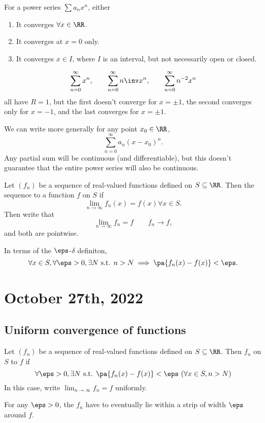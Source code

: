 \documentclass[11pt]{scrartcl}
\numberwithin{equation}{section}
\begin{document}
\begin{corollary}
    For a power series $\sum a_nx^n$, either
    \begin{enumerate}
        \item It converges $\forall x\in\RR$.
        \item It converges at $x=0$ only.
        \item It converges $x\in I$, where $I$ is an interval, but not necessarily open or closed.
    \end{enumerate}
\end{corollary}

\begin{example}
    \[ \sum_{n=0}^{\infty}x^n,\qquad \sum_{n=0}^{\infty}n\inv x^n,\qquad \sum_{n=0}^{\infty}n^{-2} x^n\]
    all have $R=1$, but the first doesn't converge for $x=\pm 1$,
    the second converges only for $x=-1$, and the last converges for 
    $x=\pm 1$.
\end{example}
We can write more generally for any point $x_0\in \RR$,
\[ \sum_{n=0}^{\infty}a_n(x-x_0)^n.\]
Any partial sum will be continuous (and differentiable),
but this doesn't guarantee that the entire power series will also 
be continuous.

\begin{definition}
    Let $(f_n)$ be a sequence of real-valued functions defined on 
    $S\subseteq\RR$. Then the sequence 
    to a function $f$ on $S$ if
    \[\lim_{n\rightarrow \infty}f_n(x)=f(x)\forall x\in S.\]
    Then write that 
    \[\lim_{n\rightarrow \infty}f_n=f \qquad f_n\to f,\]
    and both are pointwise.

    In terms of the $\eps$-$\delta$ definiton, 
    \[ \forall x\in S, \forall \eps>0, \exists N\text{ s.t. } 
    n>N \implies \pa{f_n(x)-f(x)}<\eps.\]
\end{definition}
\clearpage
\section{October 27th, 2022}
\subsection{Uniform convergence of functions}
\begin{definition}
    Let $(f_n)$ be a sequence of real-valued functions defined on 
    $S \subseteq \RR$. Then $f_n$  on $S$
    to $f$ if 
    \[
        \forall \eps>0, \exists N \text{ s.t. } \pa{f_n(x)-f(x)}<\eps \
        (\forall x\in S, n > N)
    \]
    In this case, write $\lim_{n\rightarrow \infty}f_n=f$ uniformly.
\end{definition}
For any $\eps>0$, the $f_n$ have to eventually lie within a strip 
of width $\eps$ around $f$.
\end{document}
